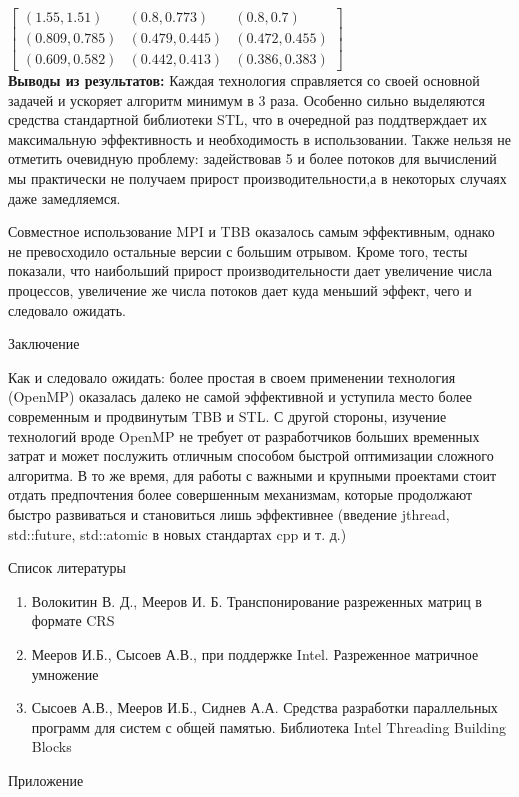 \documentclass[12pt]{article}
\begin{document}
$\begin{bmatrix}
(1.55, 1.51) & (0.8, 0.773) & (0.8, 0.7) \\
(0.809, 0.785) & (0.479, 0.445) & (0.472, 0.455) \\
(0.609, 0.582) & (0.442, 0.413) & (0.386, 0.383)
\end{bmatrix}$ \\

\textbf{Выводы из результатов:} Каждая технология справляется со своей основной задачей и ускоряет алгоритм минимум в 3 раза. Особенно сильно выделяются средства стандартной библиотеки STL, что в очередной раз поддтверждает их максимальную эффективность и необходимость в использовании. Также нельзя не отметить очевидную проблему: задействовав 5 и более потоков для вычислений мы практически не получаем прирост производительности,а в некоторых случаях даже замедляемся.

Совместное использование MPI и TBB оказалось самым эффективным, однако не превосходило остальные версии с большим отрывом. Кроме того, тесты показали, что наибольший прирост производительности дает увеличение числа процессов, увеличение же числа потоков дает куда меньший эффект, чего и следовало ожидать.
\newpage
\begin{center}
\Large{Заключение}
\end{center}
Как и следовало ожидать: более простая в своем применении технология (OpenMP) оказалась далеко не самой эффективной и уступила место более современным и продвинутым TBB и STL. С другой стороны, изучение технологий вроде OpenMP не требует от разработчиков больших временных затрат и может послужить отличным способом быстрой оптимизации сложного алгоритма. В то же время, для работы с важными и крупными проектами стоит отдать предпочтения более совершенным механизмам, которые продолжают быстро развиваться и становиться лишь эффективнее (введение jthread, std::future, std::atomic в новых стандартах cpp и т. д.)  
\newpage
\begin{center}
\Large{Список литературы}
\end{center}

\begin{enumerate}
    \item Волокитин В. Д., Мееров И. Б. Транспонирование разреженных матриц в формате CRS 
    \item Мееров И.Б., Сысоев А.В., при поддержке Intel. Разреженное матричное умножение
    \item Сысоев А.В., Мееров И.Б., Сиднев А.А. Средства разработки параллельных программ для систем с общей памятью. Библиотека Intel Threading Building Blocks
\end{enumerate}
\newpage
\begin{center}
\Large{Приложение}
\end{center}
\end{document}
